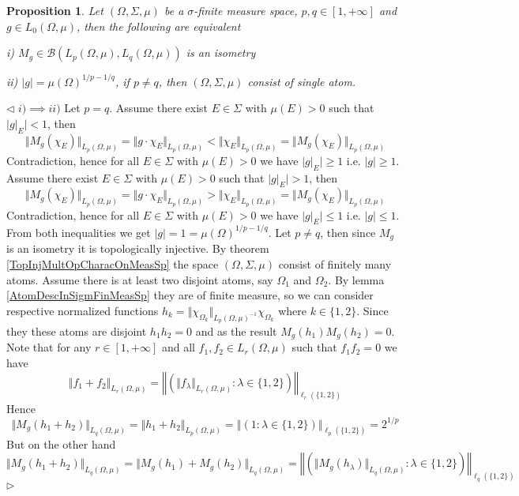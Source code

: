 \documentclass[12pt]{article}
\newtheorem{proposition}[theorem]{Proposition}
\newenvironment{proof}{\par $\triangleleft$}{$\triangleright$}
\begin{document}
\begin{proposition}\label{IsomMultOpCharacOnMeasSp} Let $(\Omega,\Sigma,\mu)$ be a $\sigma$-finite measure space, $p,q\in[1,+\infty]$ and $g\in L_0(\Omega,\mu)$, then the following are equivalent

i) $M_g\in\mathcal{B}(L_p(\Omega,\mu),L_q(\Omega,\mu))$ is an isometry

ii) $|g|=\mu(\Omega)^{1/p-1/q}$, if $p\neq q$, then $(\Omega,\Sigma,\mu)$ consist of single atom.

\end{proposition}
\begin{proof} $i)\implies ii)$ Let $p=q$. Assume there exist $E\in\Sigma$ with $\mu(E)>0$ such that $|g|_E|<1$, then
$$
\Vert M_g(\chi_E)\Vert_{L_p(\Omega,\mu)}
=\Vert g\cdot\chi_E\Vert_{L_p(\Omega,\mu)}
<\Vert\chi_E\Vert_{L_p(\Omega,\mu)}
=\Vert M_g(\chi_E)\Vert_{L_p(\Omega,\mu)}
$$
Contradiction, hence for all $E\in\Sigma$ with $\mu(E)>0$ we have $|g|_E|\geq 1$ i.e.  $|g|\geq 1$. Assume there exist $E\in\Sigma$ with $\mu(E)>0$ such that $|g|_E|>1$, then
$$
\Vert M_g(\chi_E)\Vert_{L_p(\Omega,\mu)}
=\Vert g\cdot\chi_E\Vert_{L_p(\Omega,\mu)}
>\Vert\chi_E\Vert_{L_p(\Omega,\mu)}
=\Vert M_g(\chi_E)\Vert_{L_p(\Omega,\mu)}
$$
Contradiction, hence for all $E\in\Sigma$ with $\mu(E)>0$ we have $|g|_E|\leq 1$ i.e.  $|g|\leq 1$. From both inequalities we get $|g|=1=\mu(\Omega)^{1/p-1/q}$. Let $p\neq q$, then since $M_g$ is an isometry it is topologically injective. By theorem \ref{TopInjMultOpCharacOnMeasSp} the space $(\Omega,\Sigma,\mu)$ consist of finitely many atoms. Assume there is at least two disjoint atoms, say $\Omega_1$ and $\Omega_2$. By lemma \ref{AtomDescInSigmFinMeasSp} they are of finite measure, so we can consider respective normalized functions $h_k=\Vert\chi_{\Omega_k}\Vert_{L_p(\Omega,\mu)^{-1}}\chi_{\Omega_k}$ where $k\in\{1,2\}$. Since they these atoms are disjoint $h_1h_2=0$ and as the result $M_g(h_1)M_g(h_2)=0$. Note that for any $r\in[1,+\infty]$ and all $f_1,f_2\in L_r(\Omega,\mu)$ such that $f_1f_2=0$ we have
$$
\Vert f_1+f_2\Vert_{L_r(\Omega,\mu)}
=\left\Vert\left(\Vert f_\lambda\Vert_{L_r(\Omega,\mu)}:\lambda\in\{1,2\}\right)\right\Vert_{\ell_r(\{1,2\})}
$$
Hence
$$
\Vert M_g(h_1+h_2)\Vert_{L_q(\Omega,\mu)}
=\Vert h_1+h_2\Vert_{L_p(\Omega,\mu)}
=\left\Vert\left( 1 :\lambda\in\{1,2\}\right)\right\Vert_{\ell_p(\{1,2\})}
=2^{1/p}
$$
But on the other hand
$$
\Vert M_g(h_1+h_2)\Vert_{L_q(\Omega,\mu)}
=\Vert M_g(h_1)+M_g(h_2)\Vert_{L_q(\Omega,\mu)}
=\left\Vert\left(\Vert M_g(h_\lambda)\Vert_{L_q(\Omega,\mu)}:\lambda\in\{1,2\}\right)\right\Vert_{\ell_q(\{1,2\})}
$$
\end{proof}
\end{document}
